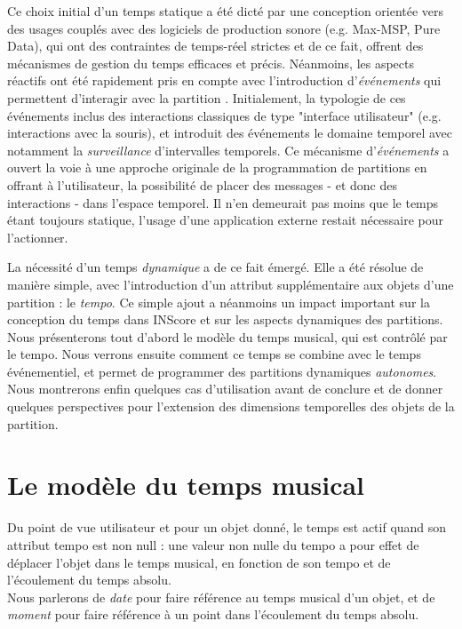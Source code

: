 \documentclass{article}
\begin{document}
Ce choix initial d'un temps statique a été dicté par une conception orientée vers des usages couplés avec des logiciels de production sonore (e.g. Max-MSP, Pure Data), qui ont des contraintes de temps-réel strictes et de ce fait, offrent des mécanismes de gestion du temps efficaces et précis. Néanmoins, les aspects réactifs ont été rapidement pris en compte avec l'introduction d'\textit{événements} qui permettent d'interagir avec la partition \cite{fober13a}. Initialement, la typologie de ces événements inclus des interactions classiques de type "interface utilisateur" (e.g. interactions avec la souris), et introduit des événements le domaine temporel avec notamment la \textit{surveillance} d'intervalles temporels. Ce mécanisme d'\textit{événements} a ouvert la voie à une approche originale de la programmation de partitions en offrant à l'utilisateur, la possibilité de placer des messages - et donc des interactions - dans l'espace temporel. Il n'en demeurait pas moins que le temps étant toujours statique, l'usage d'une application externe restait nécessaire pour l'actionner.

La nécessité d'un temps \emph{dynamique} a de ce fait émergé. Elle a été résolue de manière simple, avec l'introduction d'un attribut supplémentaire aux objets d'une partition : le \emph{tempo}. Ce simple ajout a néanmoins un impact important sur la conception du temps dans INScore et sur les aspects dynamiques des partitions. Nous présenterons tout d'abord le modèle du temps musical, qui est contrôlé par le tempo. Nous verrons ensuite comment ce temps se combine avec le temps événementiel, et permet de programmer des partitions dynamiques \emph{autonomes}. Nous montrerons enfin quelques cas d'utilisation avant de conclure et de donner quelques perspectives pour l'extension des dimensions temporelles des objets de la partition.


\section{Le modèle du temps musical}\label{mustime}

Du point de vue utilisateur et pour un objet donné, le temps est actif quand son attribut tempo est non null : une valeur non nulle du tempo a pour effet de déplacer l'objet dans le temps musical, en fonction de son tempo et de l'écoulement du temps absolu. \\
Nous parlerons de \emph{date} pour faire référence au temps musical d'un objet, et de \emph{moment} pour faire référence à un point dans l'écoulement du temps absolu. \\
\end{document}
